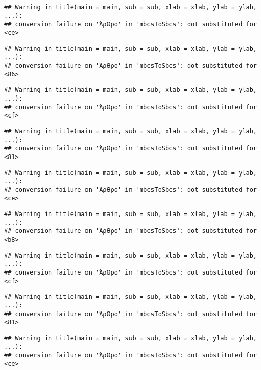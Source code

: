 \documentclass[
]{article}
\begin{document}
\begin{verbatim}
## Warning in title(main = main, sub = sub, xlab = xlab, ylab = ylab, ...):
## conversion failure on 'Άρθρο' in 'mbcsToSbcs': dot substituted for <ce>
\end{verbatim}

\begin{verbatim}
## Warning in title(main = main, sub = sub, xlab = xlab, ylab = ylab, ...):
## conversion failure on 'Άρθρο' in 'mbcsToSbcs': dot substituted for <86>
\end{verbatim}

\begin{verbatim}
## Warning in title(main = main, sub = sub, xlab = xlab, ylab = ylab, ...):
## conversion failure on 'Άρθρο' in 'mbcsToSbcs': dot substituted for <cf>
\end{verbatim}

\begin{verbatim}
## Warning in title(main = main, sub = sub, xlab = xlab, ylab = ylab, ...):
## conversion failure on 'Άρθρο' in 'mbcsToSbcs': dot substituted for <81>
\end{verbatim}

\begin{verbatim}
## Warning in title(main = main, sub = sub, xlab = xlab, ylab = ylab, ...):
## conversion failure on 'Άρθρο' in 'mbcsToSbcs': dot substituted for <ce>
\end{verbatim}

\begin{verbatim}
## Warning in title(main = main, sub = sub, xlab = xlab, ylab = ylab, ...):
## conversion failure on 'Άρθρο' in 'mbcsToSbcs': dot substituted for <b8>
\end{verbatim}

\begin{verbatim}
## Warning in title(main = main, sub = sub, xlab = xlab, ylab = ylab, ...):
## conversion failure on 'Άρθρο' in 'mbcsToSbcs': dot substituted for <cf>
\end{verbatim}

\begin{verbatim}
## Warning in title(main = main, sub = sub, xlab = xlab, ylab = ylab, ...):
## conversion failure on 'Άρθρο' in 'mbcsToSbcs': dot substituted for <81>
\end{verbatim}

\begin{verbatim}
## Warning in title(main = main, sub = sub, xlab = xlab, ylab = ylab, ...):
## conversion failure on 'Άρθρο' in 'mbcsToSbcs': dot substituted for <ce>
\end{verbatim}
\end{document}
